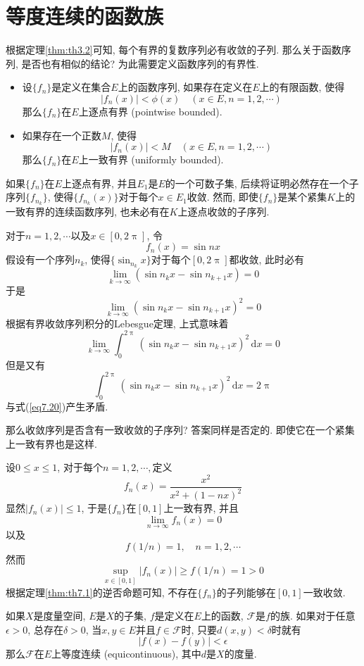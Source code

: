 \documentclass[cn,12pt,math=mtpro2,citestyle=gb7714-2015,bibstyle=gb7714-2015,twocol]{elegantbook}
\newcommand{\dx}{\,\text{d}x}
\newcommand{\limn }{\lim_{n\to\infty}}
\begin{document}
\section{等度连续的函数族}
根据定理\ref{thm:th3.2}可知, 每个有界的复数序列必有收敛的子列. 那么关于函数序列, 是否也有相似的结论? 为此需要定义函数序列的有界性.

\begin{definition}
\begin{itemize}
\item 设$\{f_n\}$是定义在集合$E$上的函数序列, 如果存在定义在$E$上的有限函数, 使得
$$|f_n(x)|<\phi(x)\quad (x\in E, n=1,2,\cdots)$$
那么$\{f_n\}$在$E$上逐点有界 (pointwise bounded).

\item 如果存在一个正数$M$, 使得
$$|f_n(x)|<M \quad (x\in E, n=1,2,\cdots)$$
那么$\{f_n\}$在$E$上一致有界 (uniformly bounded).
\end{itemize}
\end{definition}
如果$\{f_n\}$在$E$上逐点有界, 并且$E_1$是$E$的一个可数子集, 后续将证明必然存在一个子序列$\{f_{n_k}\}$, 使得$\{f_{n_k}(x)\}$对于每个$x\in E_1$收敛. 然而, 即使$\{f_n\}$是某个紧集$K$上的一致有界的连续函数序列, 也未必有在$K$上逐点收敛的子序列.
\begin{example}
对于$n=1,2,\cdots$以及$x\in [0,2\uppi]$, 令
$$f_n(x)=\sin nx$$
假设有一个序列$n_k$, 使得$\{\sin_{n_k}x\}$对于每个$[0,2\uppi]$都收敛, 此时必有
$$\lim_{k\to\infty}(\sin n_kx-\sin n_{k+1}x)=0$$
于是
$$\lim_{k\to\infty}(\sin n_kx-\sin n_{k+1}x)^2=0$$
根据有界收敛序列积分的Lebesgue定理, 上式意味着
\begin{equation}\label{eq7.20}
  \lim_{k\to\infty}\int_{0}^{2\uppi}(\sin n_kx-\sin n_{k+1}x)^2\dx=0
\end{equation}
但是又有
$$\int_{0}^{2\uppi}(\sin n_kx-\sin n_{k+1}x)^2\dx=2\uppi$$
与式(\ref{eq7.20})产生矛盾.
\end{example}
那么收敛序列是否含有一致收敛的子序列? 答案同样是否定的. 即使它在一个紧集上一致有界也是这样.
\begin{example}\label{ex4}
设$0\leq x\leq 1$, 对于每个$n=1,2,\cdots,$定义
$$f_n(x)=\frac{x^2}{x^2+(1-nx)^2}$$
显然$|f_n(x)|\leq 1$, 于是$\{f_n\}$在$[0,1]$上一致有界, 并且
$$\limn f_n(x)=0$$
以及
$$f(1/n)=1,\quad n=1,2,\cdots$$
然而
$$\sup_{x\in[0,1]}|f_n(x)|\geq f(1/n)=1>0$$
根据定理\ref{thm:th7.1}的逆否命题可知, 不存在$\{f_n\}$的子列能够在$[0,1]$一致收敛.
\end{example}
\begin{definition}
如果$X$是度量空间, $E$是$X$的子集, $f$是定义在$E$上的函数, $\mathscr{F}$是$f$的族. 如果对于任意$\epsilon>0$, 总存在$\delta>0$, 当$x,y\in E$并且$f\in\mathscr{F}$时, 只要$d(x,y)<\delta$时就有
$$|f(x)-f(y)|<\epsilon$$
那么$\mathscr{F}$在$E$上等度连续 (equicontinuous), 其中$d$是$X$的度量.
\end{definition}
\end{document}
